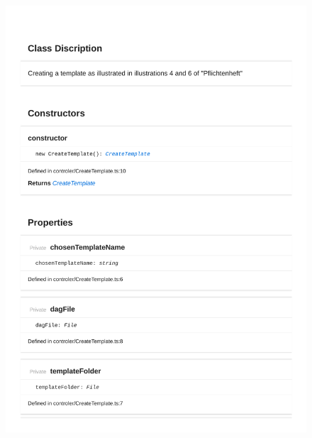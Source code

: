 \begin{figure}[H]
\centerline{\includegraphics[width=\textwidth]{FrontendDocsAsPDF/Model/CreateTemplate.pdf}}
\end{figure}


